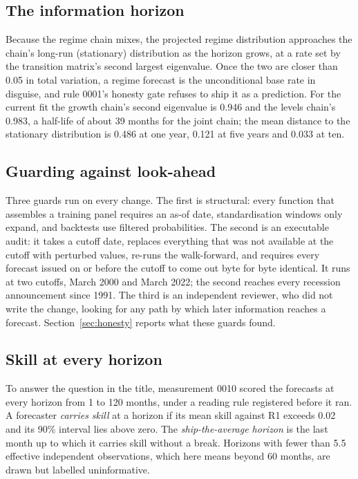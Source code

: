 \documentclass[11pt]{article}
\begin{document}
\subsection{The information horizon}

Because the regime chain mixes, the projected regime distribution approaches the chain's long-run
(stationary) distribution as the horizon grows, at a rate set by the transition matrix's second largest
eigenvalue. Once the two are closer than 0.05 in total variation, a regime forecast is the unconditional
base rate in disguise, and rule 0001's honesty gate refuses to ship it as a prediction. For the current
fit the growth chain's second eigenvalue is 0.946 and the levels chain's 0.983, a half-life of about 39
months for the joint chain; the mean distance to the stationary distribution is 0.486 at one year, 0.121
at five years and 0.033 at ten.

\subsection{Guarding against look-ahead}\label{sec:audit}

Three guards run on every change. The first is structural: every function that assembles a training
panel requires an as-of date, standardisation windows only expand, and backtests use filtered
probabilities. The second is an executable audit: it takes a cutoff date, replaces everything that was
not available at the cutoff with perturbed values, re-runs the walk-forward, and requires every forecast
issued on or before the cutoff to come out byte for byte identical. It runs at two cutoffs, March 2000
and March 2022; the second reaches every recession announcement since 1991. The third is an independent
reviewer, who did not write the change, looking for any path by which later information reaches a
forecast. Section~\ref{sec:honesty} reports what these guards found.

\subsection{Skill at every horizon}\label{sec:horizon-rule}

To answer the question in the title, measurement 0010 scored the forecasts at every horizon from 1 to 120
months, under a reading rule registered before it ran. A forecaster \emph{carries skill} at a horizon if
its mean skill against R1 exceeds 0.02 and its 90\% interval lies above zero. The \emph{ship-the-average
horizon} is the last month up to which it carries skill without a break. Horizons with fewer than 5.5
effective independent observations, which here means beyond 60 months, are drawn but labelled
uninformative.
\end{document}
